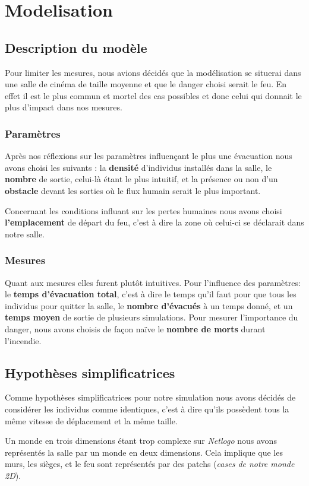 \documentclass{article}
\begin{document}
\section{Modelisation} 
\subsection{Description du modèle} 
Pour limiter les mesures, nous avions décidés que la modélisation se situerai dans une salle de cinéma de taille moyenne et que le danger choisi serait le feu. En effet il est le plus commun et mortel des cas possibles et donc celui qui donnait le plus d’impact dans nos mesures.

\subsubsection{Paramètres}
Après nos réflexions sur les paramètres influençant le plus une évacuation nous avons choisi les suivants : la {\bf densité} d’individus installés dans la salle, le {\bf nombre} de sortie, celui-là étant le plus intuitif, et la présence ou non d’un {\bf obstacle} devant les sorties où le flux humain serait le plus important.

Concernant les conditions influant sur les pertes humaines nous avons choisi {\bf l'emplacement} de départ du feu, c'est à dire la zone où celui-ci se déclarait dans notre salle.

\subsubsection{Mesures}
Quant aux mesures elles furent plutôt intuitives. Pour l'influence des paramètres: le {\bf temps d’évacuation total}, c’est à dire le temps qu’il faut pour que tous les individus pour quitter la salle,
le {\bf nombre d’évacués} à un temps donné, et un {\bf temps moyen} de sortie de plusieurs simulations. Pour mesurer l’importance du danger, nous avons choisis de façon naïve le {\bf nombre de morts} durant l’incendie. 

\subsection{Hypothèses simplificatrices} 
Comme hypothèses simplificatrices pour notre simulation nous avons décidés de considérer les individus comme identiques, c’est à dire qu’ils possèdent tous la même vitesse de déplacement et la même taille.

Un monde en trois dimensions étant trop complexe sur {\it Netlogo} nous avons représentés la salle par un monde en deux dimensions. Cela implique que les murs, les sièges, et le feu sont représentés par des patchs ({\em cases de notre monde 2D}).
\end{document}
